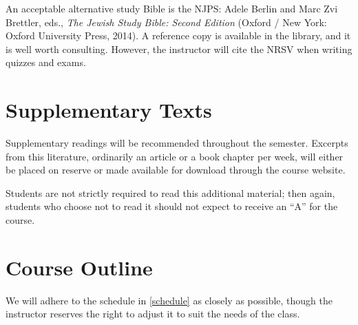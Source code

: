 \documentclass[titlepage]{article}
\begin{document}
An acceptable alternative study Bible is the NJPS: Adele Berlin and Marc
Zvi Brettler, eds., \emph{The Jewish Study Bible: Second Edition}
(Oxford / New York: Oxford University Press, 2014). A reference copy is
available in the library, and it is well worth consulting. However, the
instructor will cite the NRSV when writing quizzes and exams.

\section{Supplementary Texts}
\label{supplementary}

Supplementary readings will be recommended throughout the semester.
Excerpts from this literature, ordinarily an article or a book chapter
per week, will either be placed on reserve or made available for
download through the course website.

Students are not strictly required to read this additional material;
then again, students who choose not to read it should not expect to
receive an ``A'' for the course.

\section{Course Outline}
\label{outline}

We will adhere to the schedule in \autoref{schedule} as closely as
possible, though the instructor reserves the right to adjust it to suit
the needs of the class.

\newcommand\HBFB[1]{\cite[pp.~#1]{hbfb}}
\end{document}
